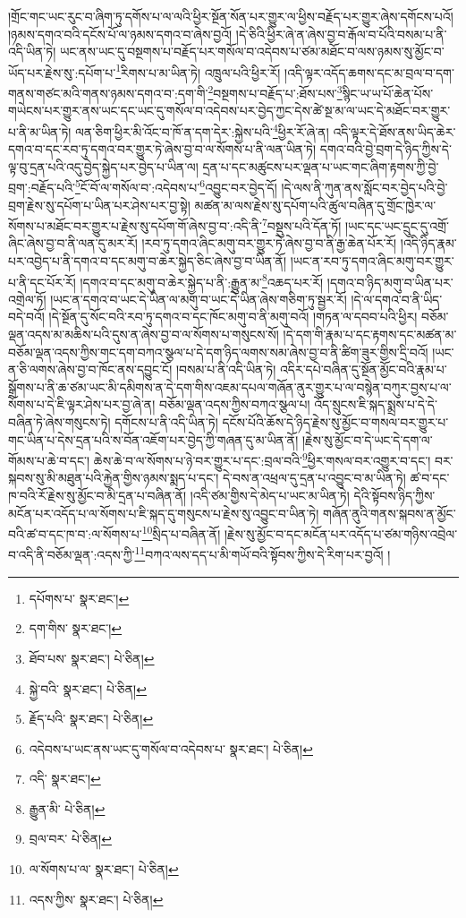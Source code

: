 །གྲོང་གང་ཡང་རུང་བ་ཞིག་ཏུ་དགོས་པ་ལ་ལའི་ཕྱིར་སྔོན་སོན་པར་གྱུར་ལ་ཕྱིས་བརྗོད་པར་གྱུར་ཞེས་དགོངས་པའོ། །ཉམས་དགའ་བའི་དངོས་པོ་ལ་ཉམས་དགའ་བ་ཞེས་བྱའོ། །དེ་ཅིའི་ཕྱིར་ཞེ་ན་ཞེས་བྱ་བ་རྒོལ་བ་པོའི་བསམ་པ་ནི་འདི་ཡིན་ཏེ། ཡང་ནས་ཡང་དུ་བསྔགས་པ་བརྗོད་པར་གསོལ་བ་འདེབས་པ་ཙམ་མཐོང་བ་ལས་ཉམས་སུ་མྱོང་བ་ཡོད་པར་རྗེས་སུ་:དཔོག་པ་\footnote{དཔོགས་པ་  སྣར་ཐང་། }རིགས་པ་མ་ཡིན་ཏེ། འཁྲུལ་པའི་ཕྱིར་རོ། །འདི་ལྟར་འདོད་ཆགས་དང་མ་བྲལ་བ་དག་གནས་གཙང་མའི་གནས་ཉམས་དགའ་བ་:དག་གི་\footnote{དག་གིས་  སྣར་ཐང་། }བསྔགས་པ་བརྗོད་པ་:ཐོས་པས་\footnote{ཐོབ་པས་  སྣར་ཐང་།  པེ་ཅིན། }སྙིང་ཡ་ཡ་པོ་ཆེན་པོས་གཡེངས་པར་གྱུར་ནས་ཡང་དང་ཡང་དུ་གསོལ་བ་འདེབས་པར་བྱེད་ཀྱང་དེས་ཚེ་སྔ་མ་ལ་ཡང་དེ་མཐོང་བར་གྱུར་པ་ནི་མ་ཡིན་ཏེ། ལན་ཅིག་ཕྱིར་མི་འོང་བ་ཁོ་ན་དག་དེར་:སྐྱེས་པའི་\footnote{སྐྱེ་བའི་  སྣར་ཐང་།  པེ་ཅིན། }ཕྱིར་རོ་ཞེ་ན། འདི་ལྟར་དེ་ཐོས་ནས་ཡིད་ཆེར་དགའ་བ་དང་རབ་ཏུ་དགའ་བར་གྱུར་ཏེ་ཞེས་བྱ་བ་ལ་སོགས་པ་ནི་ལན་ཡིན་ཏེ། དགའ་བའི་བྱེ་བྲག་དེ་ཉིད་ཀྱིས་དེ་ལྟ་བུ་དྲན་པའི་འདུ་བྱེད་སྐྱེད་པར་བྱེད་པ་ཡིན་ལ། དྲན་པ་དང་མཚུངས་པར་ལྡན་པ་ཡང་གང་ཞིག་རྟགས་ཀྱི་བྱེ་བྲག་:བརྗོད་པའི་\footnote{རྗོད་པའི་  སྣར་ཐང་།  པེ་ཅིན། }ངོ་བོ་ལ་གསོལ་བ་:འདེབས་པ་\footnote{འདེབས་པ་ཡང་ནས་ཡང་དུ་གསོལ་བ་འདེབས་པ་  སྣར་ཐང་།  པེ་ཅིན། }འབྱུང་བར་བྱེད་དོ། །དེ་ལས་ནི་ཀུན་ནས་སློང་བར་བྱེད་པའི་བྱེ་བྲག་རྗེས་སུ་དཔོག་པ་ཡིན་པར་ཤེས་པར་བྱ་སྟེ། མཚན་མ་ལས་རྗེས་སུ་དཔོག་པའི་ཚུལ་བཞིན་དུ་གྲོང་ཁྱེར་ལ་སོགས་པ་མཐོང་བར་གྱུར་པ་རྗེས་སུ་དཔོག་གོ་ཞེས་བྱ་བ་:འདི་ནི་\footnote{འདི་  སྣར་ཐང་། }བསྡུས་པའི་དོན་ཏོ། །ཡང་དང་ཡང་དྲུང་དུ་འགྲོ་ཞིང་ཞེས་བྱ་བ་ནི་ལན་དུ་མར་རོ། །རབ་ཏུ་དགའ་ཞིང་མགུ་བར་གྱུར་ཏེ་ཞེས་བྱ་བ་ནི་རྒྱ་ཆེན་པོར་རོ། །འདི་ཉིད་རྣམ་པར་འབྱེད་པ་ནི་དགའ་བ་དང་མགུ་བ་ཆེར་སྐྱེད་ཅིང་ཞེས་བྱ་བ་ཡིན་ནོ། །ཡང་ན་རབ་ཏུ་དགའ་ཞིང་མགུ་བར་གྱུར་པ་ནི་དང་པོར་རོ། །དགའ་བ་དང་མགུ་བ་ཆེར་སྐྱེད་པ་ནི་:རྒྱུན་མ་\footnote{རྒྱུན་མི་  པེ་ཅིན། }འཆད་པར་རོ། །དགའ་བ་ཉིད་མགུ་བ་ཡིན་པར་འགྲེལ་ཏོ། །ཡང་ན་དགའ་བ་ཡང་དེ་ཡིན་ལ་མགུ་བ་ཡང་དེ་ཡིན་ཞེས་གཅིག་ཏུ་སྦྱར་རོ། །དེ་ལ་དགའ་བ་ནི་ཡིད་བདེ་བའོ། །དེ་སྔོན་དུ་སོང་བའི་རབ་ཏུ་དགའ་བ་དང་ཁོང་མགུ་བ་ནི་མགུ་བའོ། །གཏན་ལ་དབབ་པའི་ཕྱིར། བཅོམ་ལྡན་འདས་མ་མཆིས་པའི་དུས་ན་ཞེས་བྱ་བ་ལ་སོགས་པ་གསུངས་སོ། །དེ་དག་གི་རྣམ་པ་དང་རྟགས་དང་མཚན་མ་བཅོམ་ལྡན་འདས་ཀྱིས་གང་དག་བཀའ་སྩལ་པ་དེ་དག་ཉིད་ལགས་སམ་ཞེས་བྱ་བ་ནི་ཚིག་ཟུར་གྱིས་དྲི་བའོ། །ཡང་ན་ཅི་ལགས་ཞེས་བྱ་བ་ཁོང་ནས་དབྱུང་ངོ། །བསམ་པ་ནི་འདི་ཡིན་ཏེ། འདིར་དཔེ་བཞིན་དུ་སྔོན་མྱོང་བའི་རྣམ་པ་སྒྲོགས་པ་ནི་ཆ་ཙམ་ཡང་མི་དམིགས་ན་དེ་དག་གིས་འཇམ་དཔལ་གཞོན་ནུར་གྱུར་པ་ལ་བསྙེན་བཀུར་བྱས་པ་ལ་སོགས་པ་དེ་ཇི་ལྟར་ཤེས་པར་བྱ་ཞེ་ན། བཅོམ་ལྡན་འདས་ཀྱིས་བཀའ་སྩལ་པ། འོད་སྲུངས་ཇི་སྐད་སྨྲས་པ་དེ་དེ་བཞིན་ཏེ་ཞེས་གསུངས་ཏེ། དགོངས་པ་ནི་འདི་ཡིན་ཏེ། དངོས་པོའི་ཆོས་དེ་ཉིད་རྗེས་སུ་མྱོང་བ་གསལ་བར་གྱུར་པ་གང་ཡིན་པ་དེས་དྲན་པའི་ས་བོན་འཇོག་པར་བྱེད་ཀྱི་གཞན་དུ་མ་ཡིན་ནོ། །རྗེས་སུ་མྱོང་བ་དེ་ཡང་དེ་དག་ལ་གོམས་པ་ཆེ་བ་དང་། ཆེས་ཆེ་བ་ལ་སོགས་པ་ཉེ་བར་གྱུར་པ་དང་:བྲལ་བའི་\footnote{བྲལ་བར་  པེ་ཅིན། }ཕྱིར་གསལ་བར་འགྱུར་བ་དང་། བར་སྐབས་སུ་མི་མཐུན་པའི་རྐྱེན་གྱིས་ཉམས་སྨད་པ་དང་། དེ་བས་ན་འཕྲལ་དུ་དྲན་པ་འབྱུང་བ་མ་ཡིན་ཏེ། ཚ་བ་དང་ཁ་བའི་རོ་རྗེས་སུ་མྱོང་བ་མི་དྲན་པ་བཞིན་ནོ། །འདི་ཙམ་གྱིས་དེ་མེད་པ་ཡང་མ་ཡིན་ཏེ། དེའི་སྟོབས་ཉིད་ཀྱིས་མངོན་པར་འདོད་པ་ལ་སོགས་པ་ཇི་སྐད་དུ་གསུངས་པ་རྗེས་སུ་འབྱུང་བ་ཡིན་ཏེ། གཞོན་ནུའི་གནས་སྐབས་ན་མྱོང་བའི་ཚ་བ་དང་ཁ་བ་:ལ་སོགས་པ་\footnote{ལ་སོགས་པ་ལ་  སྣར་ཐང་།  པེ་ཅིན། }སྲིད་པ་བཞིན་ནོ། །རྗེས་སུ་མྱོང་བ་དང་མངོན་པར་འདོད་པ་ཙམ་གཉིས་འབྲེལ་བ་འདི་ནི་བཅོམ་ལྡན་:འདས་ཀྱི་\footnote{འདས་ཀྱིས་  སྣར་ཐང་།  པེ་ཅིན། }བཀའ་ལས་དད་པ་མི་གཡོ་བའི་སྟོབས་ཀྱིས་དེ་རིག་པར་བྱའོ། །
